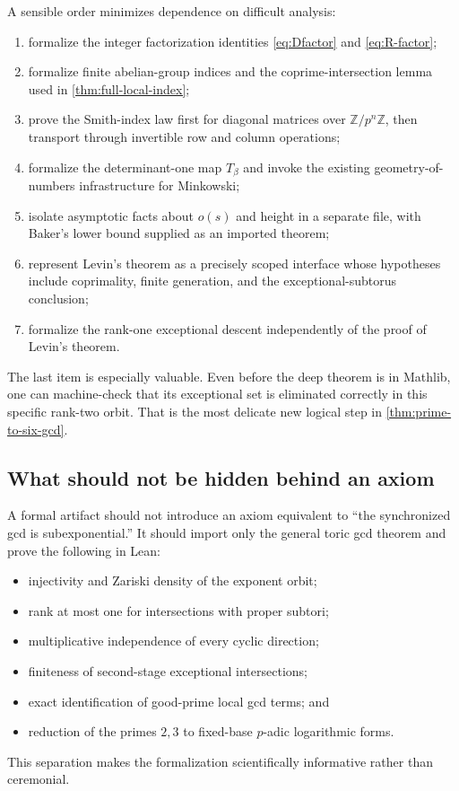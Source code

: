 \documentclass[11pt,oneside]{article}
\theoremstyle{definition}
\newcommand{\Z}{\mathbb{Z}}
\begin{document}
A sensible order minimizes dependence on difficult analysis:
\begin{enumerate}
  \item formalize the integer factorization identities
        \eqref{eq:Dfactor} and \eqref{eq:R-factor};
  \item formalize finite abelian-group indices and the coprime-intersection
        lemma used in \cref{thm:full-local-index};
  \item prove the Smith-index law first for diagonal matrices over
        $\Z/p^n\Z$, then transport through invertible row and column
        operations;
  \item formalize the determinant-one map $T_\beta$ and invoke the existing
        geometry-of-numbers infrastructure for Minkowski;
  \item isolate asymptotic facts about $o(s)$ and height in a separate
        file, with Baker's lower bound supplied as an imported theorem;
  \item represent Levin's theorem as a precisely scoped interface whose
        hypotheses include coprimality, finite generation, and the
        exceptional-subtorus conclusion;
  \item formalize the rank-one exceptional descent independently of the
        proof of Levin's theorem.
\end{enumerate}

The last item is especially valuable.  Even before the deep theorem is in
Mathlib, one can machine-check that its exceptional set is eliminated
correctly in this specific rank-two orbit.  That is the most delicate new
logical step in \cref{thm:prime-to-six-gcd}.

\subsection{What should not be hidden behind an axiom}

A formal artifact should not introduce an axiom equivalent to
``the synchronized gcd is subexponential.''  It should import only the
general toric gcd theorem and prove the following in Lean:
\begin{itemize}
  \item injectivity and Zariski density of the exponent orbit;
  \item rank at most one for intersections with proper subtori;
  \item multiplicative independence of every cyclic direction;
  \item finiteness of second-stage exceptional intersections;
  \item exact identification of good-prime local gcd terms; and
  \item reduction of the primes $2,3$ to fixed-base $p$-adic logarithmic
        forms.
\end{itemize}
This separation makes the formalization scientifically informative rather
than ceremonial.
\end{document}

